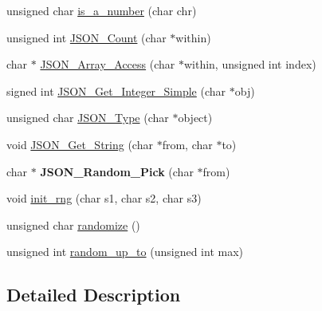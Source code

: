 \begin{DoxyCompactItemize}
unsigned char \hyperlink{libfortune-0_81_8c_ab80c73f7da157403f823fb5198308d9a}{is\-\_\-a\-\_\-number} (char chr)
\item 
unsigned int \hyperlink{libfortune-0_81_8c_aecbb4d24659ac06794bc2f9a642c038c}{\-J\-S\-O\-N\-\_\-\-Count} (char $\ast$within)
\item 
char $\ast$ \hyperlink{libfortune-0_81_8c_a782f3728bd38a0f6197006299e899269}{\-J\-S\-O\-N\-\_\-\-Array\-\_\-\-Access} (char $\ast$within, unsigned int index)
\item 
signed int \hyperlink{libfortune-0_81_8c_a9dda3cdeca6624eef215776a4825aa77}{\-J\-S\-O\-N\-\_\-\-Get\-\_\-\-Integer\-\_\-\-Simple} (char $\ast$obj)
\item 
unsigned char \hyperlink{libfortune-0_81_8c_ad89db89264f28e53242394f437c52d6c}{\-J\-S\-O\-N\-\_\-\-Type} (char $\ast$object)
\item 
void \hyperlink{libfortune-0_81_8c_a57aad7508634da6656769b019de5e07c}{\-J\-S\-O\-N\-\_\-\-Get\-\_\-\-String} (char $\ast$from, char $\ast$to)
\item 
\hypertarget{libfortune-0_81_8c_a2d51cec3c76e02eac445acaa1afa9b21}{char $\ast$ {\bfseries \-J\-S\-O\-N\-\_\-\-Random\-\_\-\-Pick} (char $\ast$from)}\label{libfortune-0_81_8c_a2d51cec3c76e02eac445acaa1afa9b21}

\item 
void \hyperlink{libfortune-0_81_8c_a0b4afb5af314702c76556b7d3ba0c84d}{init\-\_\-rng} (char s1, char s2, char s3)
\item 
unsigned char \hyperlink{libfortune-0_81_8c_a0ba09fe787749c67922dbb0b59758049}{randomize} ()
\item 
unsigned int \hyperlink{libfortune-0_81_8c_aa5e24e7fe12173f4dc6b99e36e5bda1a}{random\-\_\-up\-\_\-to} (unsigned int max)
\end{DoxyCompactItemize}


\subsection{\-Detailed \-Description}


